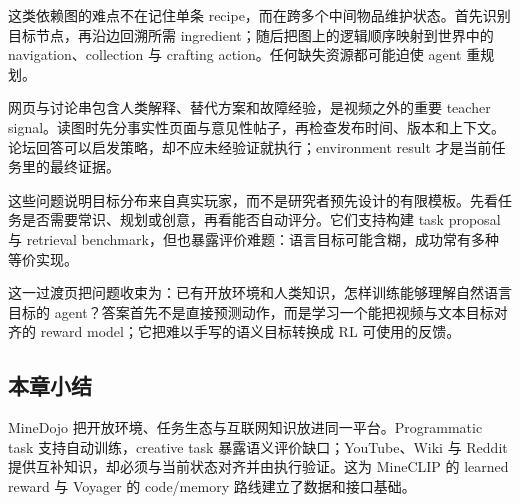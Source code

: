 这类依赖图的难点不在记住单条 recipe，而在跨多个中间物品维护状态。首先识别目标节点，再沿边回溯所需 ingredient；随后把图上的逻辑顺序映射到世界中的 navigation、collection 与 crafting action。任何缺失资源都可能迫使 agent 重规划。


网页与讨论串包含人类解释、替代方案和故障经验，是视频之外的重要 teacher signal。读图时先分事实性页面与意见性帖子，再检查发布时间、版本和上下文。论坛回答可以启发策略，却不应未经验证就执行；environment result 才是当前任务里的最终证据。


这些问题说明目标分布来自真实玩家，而不是研究者预先设计的有限模板。先看任务是否需要常识、规划或创意，再看能否自动评分。它们支持构建 task proposal 与 retrieval benchmark，但也暴露评价难题：语言目标可能含糊，成功常有多种等价实现。



这一过渡页把问题收束为：已有开放环境和人类知识，怎样训练能够理解自然语言目标的 agent？答案首先不是直接预测动作，而是学习一个能把视频与文本目标对齐的 reward model；它把难以手写的语义目标转换成 RL 可使用的反馈。

\subsection{本章小结}

MineDojo 把开放环境、任务生态与互联网知识放进同一平台。Programmatic task 支持自动训练，creative task 暴露语义评价缺口；YouTube、Wiki 与 Reddit 提供互补知识，却必须与当前状态对齐并由执行验证。这为 MineCLIP 的 learned reward 与 Voyager 的 code/memory 路线建立了数据和接口基础。

